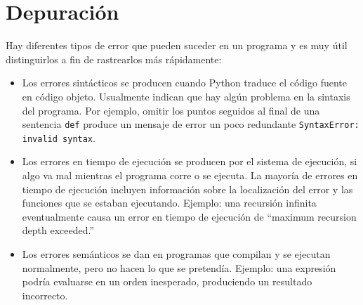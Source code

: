 

%
\chapter{Depuración}

Hay diferentes tipos de error que pueden suceder en un programa y
es muy útil distinguirlos a fin de rastrearlos más rápidamente:

\begin{itemize}

\item Los errores sintácticos se producen cuando Python traduce
el código fuente en código objeto. Usualmente indican que hay
algún problema en la sintaxis del programa. Por ejemplo, omitir
los puntos seguidos al final de una sentencia \texttt{def} produce
un mensaje de error un poco redundante \texttt{SyntaxError: invalid syntax}.

\item Los errores en tiempo de ejecución se producen por el sistema
de ejecución, si algo va mal mientras el programa corre o se ejecuta.
La mayoría de errores en tiempo de ejecución incluyen información 
sobre la localización del error y las funciones que se estaban 
ejecutando.
Ejemplo: una recursión infinita eventualmente causa un error
en tiempo de ejecución de ``maximum recursion depth exceeded.''

\item Los errores semánticos se dan en programas que compilan y
se ejecutan normalmente, pero no hacen lo que se pretendía. Ejemplo:
una expresión podría evaluarse en un orden inesperado,
produciendo un resultado incorrecto.

\end{itemize}

